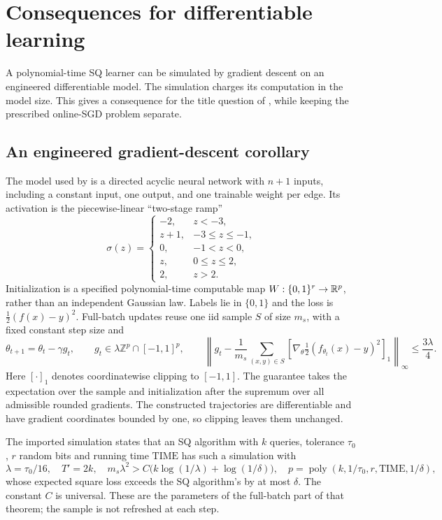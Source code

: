 \section{Consequences for differentiable learning}\label{sec:resources}
A polynomial-time SQ learner can be simulated by gradient descent on an engineered differentiable model. The simulation charges its computation in the model size. This gives a consequence for the title question of \citet{FKS26}, while keeping the prescribed online-SGD problem separate.

\subsection{An engineered gradient-descent corollary}
The model used by \citet[Theorem~3d]{AKMSS21} is a directed acyclic neural network with $n+1$ inputs, including a constant input, one output, and one trainable weight per edge. Its activation is the piecewise-linear ``two-stage ramp''
\[
 \sigma(z)=\begin{cases}
 -2,&z<-3,\\ z+1,&-3\le z\le-1,\\0,&-1<z<0,\\z,&0\le z\le2,\\2,&z>2.
 \end{cases}
\]
Initialization is a specified polynomial-time computable map $W:\{0,1\}^r\to\mathbb R^p$, rather than an independent Gaussian law. Labels lie in $\{0,1\}$ and the loss is $\tfrac12(f(x)-y)^2$. Full-batch updates reuse one iid sample $S$ of size $m_s$, with a fixed constant step size and
\begin{equation}\label{eq:engineered-gradient}
 \theta_{t+1}=\theta_t-\gamma g_t,\qquad
 g_t\in\lambda\mathbb Z^p\cap[-1,1]^p,\qquad
 \left\|g_t-\frac1{m_s}\sum_{(x,y)\in S}
       [\nabla_\theta\tfrac12(f_{\theta_t}(x)-y)^2]_1\right\|_\infty
 \le\frac{3\lambda}{4}.
\end{equation}
Here $[\cdot]_1$ denotes coordinatewise clipping to $[-1,1]$. The guarantee takes the expectation over the sample and initialization after the supremum over all admissible rounded gradients. The constructed trajectories are differentiable and have gradient coordinates bounded by one, so clipping leaves them unchanged.

The imported simulation states that an SQ algorithm with $k$ queries, tolerance $\tau_0$, $r$ random bits and running time $\mathrm{TIME}$ has such a simulation with
\begin{equation}\label{eq:engineered-parameters}
 \lambda=\tau_0/16,\quad T'=2k,\quad
 m_s\lambda^2>C\bigl(k\log(1/\lambda)+\log(1/\delta)\bigr),\quad
 p=\operatorname{poly}(k,1/\tau_0,r,\mathrm{TIME},1/\delta),
\end{equation}
whose expected square loss exceeds the SQ algorithm's by at most $\delta$. The constant $C$ is universal. These are the parameters of the full-batch part of that theorem; the sample is not refreshed at each step.

